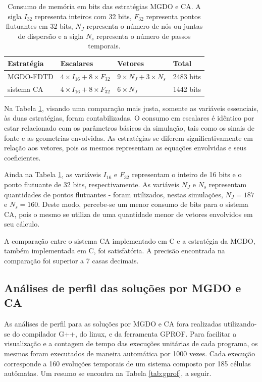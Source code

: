 \begin{table}
\centering
\caption{\label{tab:memoria} Consumo de memória em bits das estratégias MGDO e CA. A sigla $I_{32}$ representa inteiros com 32 bits, $F_{32}$ representa pontos flutuantes em 32 bits, $N_J$ representa o número de nós ou juntas de dispersão e a sigla $N_s$ representa o número de passos temporais.}
\begin{tabular}{ |p{3cm}|p{3cm}|p{3cm}|p{3cm}|  }
 \hline
Estratégia & Escalares & Vetores & Total \\
 \hline
 MGDO-FDTD   & $4 \times I_{16} + 8 \times F_{32}$ & $9 \times N_J + 3 \times N_s$ & 2483 bits \\
 sistema CA  & $4 \times I_{16} + 8 \times F_{32}$ & $6 \times N_J$ & 1442 bits \\
 \hline
\end{tabular}
\end{table}

Na Tabela \ref{tab:memoria}, visando uma comparação mais justa, somente as variáveis essenciais, às duas estratégias, foram contabilizadas. O consumo em escalares é idêntico por estar relacionado com os parâmetros básicos da simulação, tais como os sinais de fonte e as geometrias envolvidas. As estratégias se diferem significativamente em relação aos vetores, pois os mesmos representam as equações envolvidas e seus coeficientes. 

Ainda na Tabela \ref{tab:memoria}, as variáveis $I_{16}$ e $F_{32}$ representam o inteiro de 16 bits e o ponto flutuante de 32 bits, respectivamente. As variáveis $N_J$ e $N_s$ representam quantidades de pontos flutuantes - foram utilizados, nestas simulações, $N_J= 187$ e $N_s= 160$. Deste modo, percebe-se um menor consumo de bits para o sistema CA, pois o mesmo se utiliza de uma quantidade menor de vetores envolvidos em seu cálculo.

A comparação entre o sistema CA implementado em C e a estratégia da MGDO, também implementada em C, foi satisfatória. A precisão encontrada na comparação foi superior a 7 casas decimais.

\subsection{Análises de perfil das soluções por MGDO e CA}

As análises de perfil para as soluções por MGDO e CA fora realizadas utilizando-se do compilador G++, do linux, e da ferramenta GPROF. Para facilitar a visualização e a contagem de tempo das execuções unitárias de cada programa, os mesmos foram executados de maneira automática por 1000 vezes. Cada execução corresponde a 160 evoluções temporais de um sistema composto por 185 células autômatas. Um resumo se encontra na Tabela \ref{tab:gprof}, a seguir.

